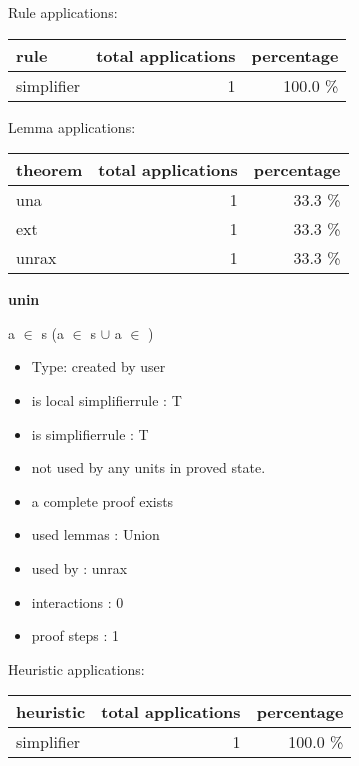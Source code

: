 \documentclass[a4paper]{article}
\begin{document}
Rule applications:

\begin{supertabular}{l|r|r}
rule	        & total applications & percentage \\ \hline
simplifier & 1 & 100.0 \% \\

\end{supertabular}

Lemma applications:

\begin{supertabular}{l|r|r}
theorem	        & total applications & percentage \\ \hline
una & 1 & 33.3 \% \\
ext & 1 & 33.3 \% \\
unrax & 1 & 33.3 \% \\

\end{supertabular}
\pagebreak

{\LARGE\bf unin}\label{lemma-unin}

\medskip

 \Fol \Not a $\in$ s \Imp (a $\in$ s $\cup$  \Equiv a $\in$ )

\begin{itemize}

\item Type: created by user

\item is local simplifierrule : T
\item is simplifierrule : T
\item not used by any units in proved state.
\item       a complete proof exists
\item       used lemmas  : Union
\item       used by      : unrax
\item       interactions : 0
\item       proof steps  : 1
\end{itemize}

\medskip


Heuristic applications:

\begin{supertabular}{l|r|r}
heuristic	& total applications & percentage \\ \hline
simplifier & 1 & 100.0 \% \\

\end{supertabular}
\end{document}
